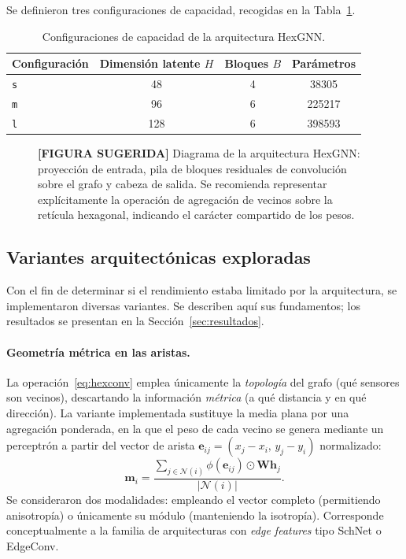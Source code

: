 Se definieron tres configuraciones de capacidad, recogidas en la Tabla~\ref{tab:hexgnn-tamanos}.

\begin{table}[htbp]
\centering
\caption{Configuraciones de capacidad de la arquitectura HexGNN.}
\label{tab:hexgnn-tamanos}
\begin{tabular}{lccc}
\toprule
\textbf{Configuración} & \textbf{Dimensión latente $H$} & \textbf{Bloques $B$} & \textbf{Parámetros} \\
\midrule
\texttt{s} & 48 & 4 & \num{38305} \\
\texttt{m} & 96 & 6 & \num{225217} \\
\texttt{l} & 128 & 6 & \num{398593} \\
\bottomrule
\end{tabular}
\end{table}

\begin{figure}[htbp]
\centering
\caption{\textbf{[FIGURA SUGERIDA]} Diagrama de la arquitectura HexGNN: proyección de entrada, pila
de bloques residuales de convolución sobre el grafo y cabeza de salida. Se recomienda representar
explícitamente la operación de agregación de vecinos sobre la retícula hexagonal, indicando el
carácter compartido de los pesos.}
\label{fig:arquitectura-hexgnn}
\end{figure}

\subsection{Variantes arquitectónicas exploradas}
\label{subsec:variantes}

Con el fin de determinar si el rendimiento estaba limitado por la arquitectura, se implementaron
diversas variantes. Se describen aquí sus fundamentos; los resultados se presentan en la
Sección~\ref{sec:resultados}.

\paragraph{Geometría métrica en las aristas.} La operación~\eqref{eq:hexconv} emplea únicamente la
\emph{topología} del grafo (qué sensores son vecinos), descartando la información \emph{métrica}
(a qué distancia y en qué dirección). La variante implementada sustituye la media plana por una
agregación ponderada, en la que el peso de cada vecino se genera mediante un perceptrón a partir del
vector de arista $\mathbf{e}_{ij} = (x_j - x_i,\, y_j - y_i)$ normalizado:
\begin{equation}
    \mathbf{m}_i = \frac{\sum_{j \in \mathcal{N}(i)} \phi(\mathbf{e}_{ij}) \odot \mathbf{W}\mathbf{h}_j}
                        {|\mathcal{N}(i)|}.
\end{equation}
Se consideraron dos modalidades: empleando el vector completo (permitiendo anisotropía) o
únicamente su módulo (manteniendo la isotropía). Corresponde conceptualmente a la familia de
arquitecturas con \emph{edge features} tipo SchNet o EdgeConv.

